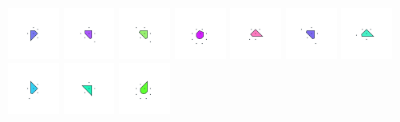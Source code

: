 \documentclass[text.tex]{subfiles}
\begin{document}
\begin{figure}[h!]
\includegraphics[width=0.12\textwidth]{img/results/octagon/octagon_241421_(0_1alpha_1)_005.pdf}
\includegraphics[width=0.12\textwidth]{img/results/octagon/octagon_241421_(0_1alpha_1)_006.pdf}
\includegraphics[width=0.12\textwidth]{img/results/octagon/octagon_241421_(0_1alpha_1)_007.pdf}
\includegraphics[width=0.12\textwidth]{img/results/octagon/octagon_241421_(0_1alpha_1)_008.pdf}
\includegraphics[width=0.12\textwidth]{img/results/octagon/octagon_241421_(0_1alpha_1)_009.pdf}
\includegraphics[width=0.12\textwidth]{img/results/octagon/octagon_241421_(0_1alpha_1)_010.pdf}
\includegraphics[width=0.12\textwidth]{img/results/octagon/octagon_241421_(0_1alpha_1)_011.pdf}
\includegraphics[width=0.12\textwidth]{img/results/octagon/octagon_241421_(0_1alpha_1)_012.pdf}
\includegraphics[width=0.12\textwidth]{img/results/octagon/octagon_241421_(0_1alpha_1)_013.pdf}
\includegraphics[width=0.12\textwidth]{img/results/octagon/octagon_241421_(0_1alpha_1)_014.pdf}
\end{figure}
\end{document}
